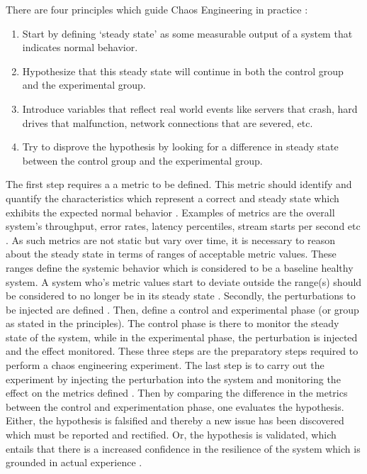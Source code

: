 \documentclass{article}
\begin{document}
There are four principles which guide Chaos Engineering  in practice \cite{principlesOfChaos}:
\begin{enumerate}
    \item Start by defining ‘steady state’ as some measurable output of a system that indicates normal behavior.
    \item Hypothesize that this steady state will continue in both the control group and the experimental group.
    \item Introduce variables that reflect real world events like servers that crash, hard drives that malfunction, network connections that are severed, etc.
    \item Try to disprove the hypothesis by looking for a difference in steady state between the control group and the experimental group.
\end{enumerate}
The first step requires a a metric to be defined. This metric should identify and quantify the characteristics which represent a correct and steady state which exhibits the expected normal behavior \cite{chaosJVM}. Examples of metrics are the overall system's throughput, error rates, latency percentiles, stream starts per second etc \cite{principlesOfChaos}\cite{OreillyChaos}. As such metrics are not static but vary over time, it is necessary to reason about the steady state in terms of ranges of acceptable metric values. These ranges define the systemic behavior which is considered to be a baseline healthy system. A system who's metric values start to deviate outside the range(s) should be considered to no longer be in its steady state \cite{chaosJVM}. Secondly, the perturbations to be injected are defined \cite{chaosJVM}. Then, define a control and experimental phase (or group as stated in the principles). The control phase is there to monitor the steady state of the system, while in the experimental phase, the perturbation is injected and the effect monitored. These three steps are the preparatory steps required to perform a chaos engineering experiment. The last step is to carry out the experiment by injecting the perturbation into the system and monitoring the effect on the metrics defined \cite{chaosJVM}. Then by comparing the difference in the metrics between the control and experimentation phase, one evaluates the hypothesis. Either, the hypothesis is falsified and thereby a new issue has been discovered which must be reported and rectified. Or, the hypothesis is validated, which entails that there is a increased confidence in the resilience of the system which is grounded in actual experience \cite{chaosJVM}.
\end{document}
